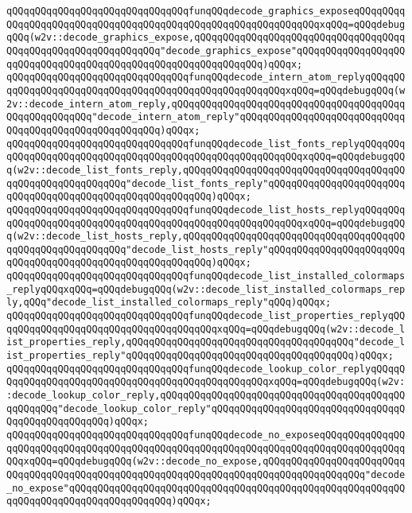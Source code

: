 \verb|qQQqqQQqqQQqqQQqqQQqqQQqqQQqqQQqfunqQQqdecode_graphics_exposeqQQqqQQqqQQqqQQqqQQqqQQqqQQqqQQqqQQqqQQqqQQqqQQqqQQqqQQqqQQqqQQqxqQQq=qQQqdebugqQQq(w2v::decode_graphics_expose,qQQqqQQqqQQqqQQqqQQqqQQqqQQqqQQqqQQqqQQqqQQqqQQqqQQqqQQqqQQqqQQq"decode_graphics_expose"qQQqqQQqqQQqqQQqqQQqqQQqqQQqqQQqqQQqqQQqqQQqqQQqqQQqqQQqqQQqqQQq)qQQqx;|\newline
\verb|qQQqqQQqqQQqqQQqqQQqqQQqqQQqqQQqfunqQQqdecode_intern_atom_replyqQQqqQQqqQQqqQQqqQQqqQQqqQQqqQQqqQQqqQQqqQQqqQQqqQQqqQQqxqQQq=qQQqdebugqQQq(w2v::decode_intern_atom_reply,qQQqqQQqqQQqqQQqqQQqqQQqqQQqqQQqqQQqqQQqqQQqqQQqqQQqqQQq"decode_intern_atom_reply"qQQqqQQqqQQqqQQqqQQqqQQqqQQqqQQqqQQqqQQqqQQqqQQqqQQqqQQq)qQQqx;|\newline
\verb|qQQqqQQqqQQqqQQqqQQqqQQqqQQqqQQqfunqQQqdecode_list_fonts_replyqQQqqQQqqQQqqQQqqQQqqQQqqQQqqQQqqQQqqQQqqQQqqQQqqQQqqQQqqQQqxqQQq=qQQqdebugqQQq(w2v::decode_list_fonts_reply,qQQqqQQqqQQqqQQqqQQqqQQqqQQqqQQqqQQqqQQqqQQqqQQqqQQqqQQqqQQq"decode_list_fonts_reply"qQQqqQQqqQQqqQQqqQQqqQQqqQQqqQQqqQQqqQQqqQQqqQQqqQQqqQQqqQQq)qQQqx;|\newline
\verb|qQQqqQQqqQQqqQQqqQQqqQQqqQQqqQQqfunqQQqdecode_list_hosts_replyqQQqqQQqqQQqqQQqqQQqqQQqqQQqqQQqqQQqqQQqqQQqqQQqqQQqqQQqqQQqxqQQq=qQQqdebugqQQq(w2v::decode_list_hosts_reply,qQQqqQQqqQQqqQQqqQQqqQQqqQQqqQQqqQQqqQQqqQQqqQQqqQQqqQQqqQQq"decode_list_hosts_reply"qQQqqQQqqQQqqQQqqQQqqQQqqQQqqQQqqQQqqQQqqQQqqQQqqQQqqQQqqQQq)qQQqx;|\newline
\verb|qQQqqQQqqQQqqQQqqQQqqQQqqQQqqQQqfunqQQqdecode_list_installed_colormaps_replyqQQqxqQQq=qQQqdebugqQQq(w2v::decode_list_installed_colormaps_reply,qQQq"decode_list_installed_colormaps_reply"qQQq)qQQqx;|\newline
\verb|qQQqqQQqqQQqqQQqqQQqqQQqqQQqqQQqfunqQQqdecode_list_properties_replyqQQqqQQqqQQqqQQqqQQqqQQqqQQqqQQqqQQqqQQqxqQQq=qQQqdebugqQQq(w2v::decode_list_properties_reply,qQQqqQQqqQQqqQQqqQQqqQQqqQQqqQQqqQQqqQQq"decode_list_properties_reply"qQQqqQQqqQQqqQQqqQQqqQQqqQQqqQQqqQQqqQQq)qQQqx;|\newline
\verb|qQQqqQQqqQQqqQQqqQQqqQQqqQQqqQQqfunqQQqdecode_lookup_color_replyqQQqqQQqqQQqqQQqqQQqqQQqqQQqqQQqqQQqqQQqqQQqqQQqqQQqxqQQq=qQQqdebugqQQq(w2v::decode_lookup_color_reply,qQQqqQQqqQQqqQQqqQQqqQQqqQQqqQQqqQQqqQQqqQQqqQQqqQQq"decode_lookup_color_reply"qQQqqQQqqQQqqQQqqQQqqQQqqQQqqQQqqQQqqQQqqQQqqQQqqQQq)qQQqx;|\newline
\verb|qQQqqQQqqQQqqQQqqQQqqQQqqQQqqQQqfunqQQqdecode_no_exposeqQQqqQQqqQQqqQQqqQQqqQQqqQQqqQQqqQQqqQQqqQQqqQQqqQQqqQQqqQQqqQQqqQQqqQQqqQQqqQQqqQQqqQQqxqQQq=qQQqdebugqQQq(w2v::decode_no_expose,qQQqqQQqqQQqqQQqqQQqqQQqqQQqqQQqqQQqqQQqqQQqqQQqqQQqqQQqqQQqqQQqqQQqqQQqqQQqqQQqqQQqqQQq"decode_no_expose"qQQqqQQqqQQqqQQqqQQqqQQqqQQqqQQqqQQqqQQqqQQqqQQqqQQqqQQqqQQqqQQqqQQqqQQqqQQqqQQqqQQqqQQq)qQQqx;|\newline
